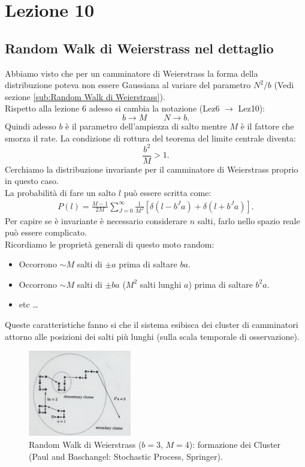\section{Lezione 10}%
\label{sub:Lezione 10}
\subsection{Random Walk di Weierstrass nel dettaglio}%
\label{sub:Random Walk di Weierstrass nel dettaglio}
Abbiamo visto che per un camminatore di Weierstrass la forma della distribuzione poteva non essere Gaussiana al variare del parametro $N^2 / b$ (Vedi sezione \ref{sub:Random Walk di Weierstrass}). \\
Rispetto alla lezione 6 adesso si cambia la notazione (Lez6 $\to $ Lez10):
\[
	b\to M \qquad  N \to b
.\]
Quindi adesso $b$ è il parametro dell'ampiezza di salto mentre $M$ è il fattore che smorza il rate. La condizione di rottura del teorema del limite centrale diventa:
\[
    \frac{b^2}{M} > 1
.\] 
Cerchiamo la distribuzione invariante per il camminatore di Weierstrass proprio in questo caso.\\
La probabilità di fare un salto $l$ può essere scritta come:
\[\begin{aligned}
    P(l) = \frac{M-1}{2M}\sum_{J=0}^{\infty} \frac{1}{M^J}\left[\delta (l-b^Ja) + \delta (l+b^Ja) \right]
.\end{aligned}\]
Per capire se è invariante è necessario considerare $n$ salti, farlo nello spazio reale può essere complicato.\\
Ricordiamo le proprietà generali di questo moto random:
\begin{itemize}
    \item Occorrono $\sim M$ salti di $\pm a$ prima di saltare $ba$.
    \item Occorrono $\sim M$ salti di $\pm ba$ ($M^2$ salti lunghi $a$) prima di saltare $b^2a$.
    \item etc \ldots
\end{itemize}
Queste caratteristiche fanno si che il sistema esibisca dei cluster di camminatori attorno alle posizioni dei salti più lunghi (sulla scala temporale di osservazione).
\begin{figure}[H]
    \centering
    \includegraphics[width=0.4\textwidth]{figures/10_RWWeierstrass.png}
    \caption{\scriptsize Random Walk di Weierstrass ($b=3$, $M=4$): formazione dei Cluster (Paul and Baschangel: Stochastic Process, Springer).}
    \label{fig:figures-10_RWWeierstrass-png}
\end{figure}
